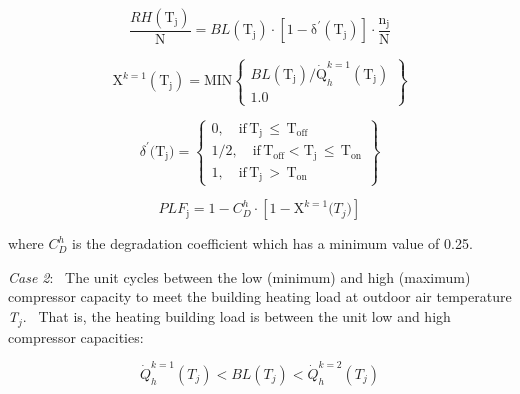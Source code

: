 \begin{equation}
\frac{{RH\left( {{{\mathrm{T}}_{\mathrm{j}}}} \right)}}{{\mathrm{N}}}{\mathrm{ = }}BL\left( {{{\mathrm{T}}_{\mathrm{j}}}} \right) \cdot \left[ {{\mathrm{1 - }}{{\mathrm{\delta }}^\prime}\left( {{{\mathrm{T}}_{\mathrm{j}}}} \right)} \right] \cdot \frac{{{{\mathrm{n}}_{\mathrm{j}}}}}{{\mathrm{N}}}
\end{equation}

\begin{equation}
{{\mathrm{X}}^{k = 1}}\left( {{{\mathrm{T}}_{\mathrm{j}}}} \right){\mathrm{ = MIN}}\left\{ \begin{array}{l}BL\left( {{{\mathrm{T}}_{\mathrm{j}}}} \right){\mathrm{/\dot Q}}_h^{k = 1}\left( {{{\mathrm{T}}_{\mathrm{j}}}} \right)\\1.0\end{array} \right\}
\end{equation}

\begin{equation}
{\delta ^\prime}{\mathrm{(}}{{\mathrm{T}}_{\mathrm{j}}}{\mathrm{) = }}\left\{ \begin{array}{l}0,\quad {\mathrm{if}}\,{{\mathrm{T}}_{\mathrm{j}}}\, \le \,{{\mathrm{T}}_{{\mathrm{off}}}}\,\\1/2,\quad {\mathrm{if}}\,{{\mathrm{T}}_{{\mathrm{off}}}} < {{\mathrm{T}}_{\mathrm{j}}}\, \le \,{{\mathrm{T}}_{{\mathrm{on}}}}\\1,\quad {\mathrm{if}}\,{{\mathrm{T}}_{\mathrm{j}}}\, > \,{{\mathrm{T}}_{{\mathrm{on}}}}\end{array} \right\}
\end{equation}

\begin{equation}
PL{F_{\mathrm{j}}}{\mathrm{ = 1 - }}C_D^h \cdot \left[ {{\mathrm{1 - }}{{\mathrm{X}}^{k = 1}}{\mathrm{(}}{T_j}{\mathrm{)}}} \right]
\end{equation}

where \(C_D^h\) is the degradation coefficient which has a minimum value of 0.25.

\emph{Case 2}:~ The unit cycles between the low (minimum) and high (maximum) compressor capacity to meet the building heating load at outdoor air temperature \emph{T\(_{j}\)}.~ That is, the heating building load is between the unit low and high compressor capacities:

\begin{equation}
\dot Q_h^{k = 1}({T_j}) < BL({T_j}) < \dot Q_h^{k = 2}({T_j})
\end{equation}

